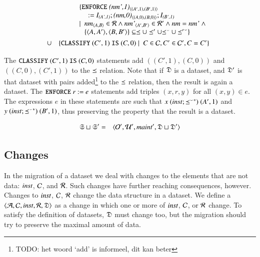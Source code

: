 \documentclass{elsarticle}
\begin{document}
\begin{definition}
   \begin{eqnarray}
      &&\begin{array}[t]{@{}l}
         \{ {\tt ENFORCE\ }\declare{(nm',1)}{(A',1)}{(B',1)}\\\quad{\tt\ :=\ }\ident{(A',1)};\declare{(nm,0)}{(A,0)}{(B,0)};\ident{(B',1)}\\
            \mid\ \begin{array}[t]{@{}l}
               \declare{nm}{A}{B}\in\rels\wedge\declare{nm'}{A'}{B'}\in\rels'\wedge\id{nm}=\id{nm'}\ \wedge\\
               \{\pair{A}{A'},\pair{B}{B'}\}\subseteq\isa\cup\isa'\cup\flip{\isa}\cup\flip{\isa'}\}
               \end{array}
           \end{array}\\
           &\cup&\begin{array}[t]{@{}l}
            \{ {\tt CLASSIFY\ }(C',1){\tt\ IS\ }(C,0)\mid\ C\in\concepts,C'\in\concepts',C=C'\}\\
           \end{array}
   \end{eqnarray}
\end{definition}

The ${\tt CLASSIFY\ }(C',1){\tt\ IS\ }(C,0)$ statements add $((C',1),(C,0))$ and  $((C,0),(C',1))$ to the $\preceq$ relation. Note that if $\mathfrak{D}$ is a dataset, and $\mathfrak{D}'$ is that dataset with pairs added\footnote{TODO: het woord `add' is informeel, dit kan beter} to the $\preceq$ relation, then the result is again a dataset.
The ${\tt ENFORCE\ }r{\tt\ :=\ }e$ statements add triples $(x,r,y)$ for all $(x,y)\in e$.
The expressions $e$ in these statements are such that $x\ (\text{\it inst\/} ; {{\preceq}^\smallsmile}^*)\ (A',1)$ and $y \ (\inst \compose \kleenestar{\flip{\isa}})\ (B',1)$, thus preserving the property that the result is a dataset.

\begin{definition}[]
   \begin{eqnarray}
      \mathfrak{S}\sqcup\mathfrak{S}'&=&\langle\mathcal{O}',\mathcal{U}',\text{\it maint\/}',\mathfrak{D}\sqcup\mathfrak{D}'\rangle
   \end{eqnarray}
\end{definition}

\subsection{Changes}
   In the migration of a dataset we deal with changes to the elements that are not data:
   $\text{\it inst\/}$, $\mathcal{C}$, and $\mathcal{R}$.
   Such changes have further reaching consequences, however.
   Changes to $\text{\it inst\/}$, $\mathcal{C}$, $\mathcal{R}$ change the data structure in a dataset.
   We define a  $\langle\mathcal{A},\mathcal{C},\text{\it inst\/},\mathcal{R},\mathfrak{D}\rangle$ as a change in which one or more of $\text{\it inst\/}$, $\mathcal{C}$, or $\mathcal{R}$ change.
   To satisfy the definition of datasets, $\mathfrak{D}$ must change too,
   but the migration should try to preserve the maximal amount of data.
\end{document}
